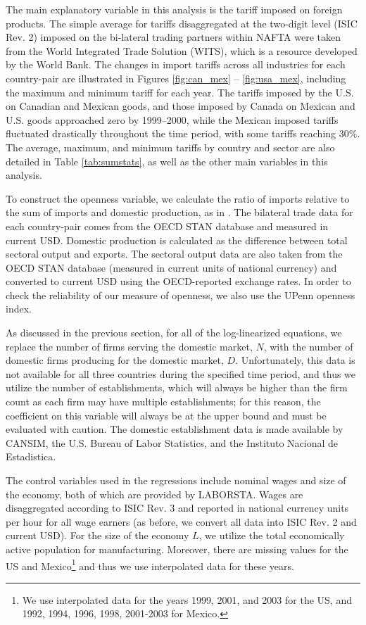 \documentclass[a4paper,12pt]{article}
\begin{document}
The main explanatory variable in this analysis is the tariff imposed on foreign products. The simple average for tariffs disaggregated at the two-digit level (ISIC Rev. 2) imposed on the bi-lateral trading partners within NAFTA were taken from the World Integrated Trade Solution (WITS), which is a resource developed by the World Bank. The changes in import tariffs across all industries for each country-pair are illustrated in Figures \ref{fig:can_mex} -- \ref{fig:usa_mex}, including the maximum and minimum tariff for each year. The tariffs imposed by the U.S. on Canadian and Mexican goods, and those imposed by Canada on Mexican and U.S. goods approached zero by 1999--2000, while the Mexican imposed tariffs fluctuated drastically throughout the time period, with some tariffs reaching 30\%. The average, maximum, and minimum tariffs by country and sector are also detailed in Table \ref{tab:sumstats}, as well as the other main variables in this analysis.

To construct the openness variable, we calculate the ratio of imports relative to the sum of imports and domestic production, as in \citet{Chen2009}. The bilateral trade data for each country-pair comes from the OECD STAN database and measured in current USD. Domestic production is calculated as the difference between total sectoral output and exports. The sectoral output data are also taken from the OECD STAN database (measured in current units of national currency) and converted to current USD using the OECD-reported exchange rates. In order to check the reliability of our measure of openness, we also use the UPenn openness index. 

As discussed in the previous section, for all of the log-linearized equations, we replace the number of firms serving the domestic market, $N$, with the number of domestic firms producing for the domestic market, $D$. Unfortunately, this data is not available for all three countries during the specified time period, and thus we utilize the number of establishments, which will always be higher than the firm count as each firm may have multiple establishments; for this reason, the coefficient on this variable will always be at the upper bound and must be evaluated with caution. The domestic establishment data is made available by CANSIM, the U.S. Bureau of Labor Statistics, and the Instituto Nacional de Estadistica. 

The control variables used in the regressions include nominal wages and size of the economy, both of which are provided by LABORSTA. Wages are disaggregated according to ISIC Rev. 3 and reported in national currency units per hour for all wage earners (as before, we convert all data into ISIC Rev. 2 and current USD). For the size of the economy $L$, we utilize the total economically active population for manufacturing. Moreover, there are missing values for the US and Mexico\footnote{We use interpolated data for the years 1999, 2001, and 2003 for the US, and 1992, 1994, 1996, 1998, 2001-2003 for Mexico.} and thus we use interpolated data for these years.
\end{document}
